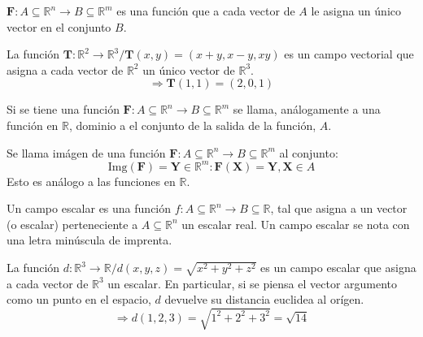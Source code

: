 \begin{definition}
    $\boldsymbol{F}:A\subseteq \mathbb{R}^n \rightarrow B \subseteq \mathbb{R}^m$
    es una función que a cada vector de $A$ le asigna un único vector en el conjunto $B$.
    \begin{example}
        La función $\boldsymbol{T}:\mathbb{R}^2 \rightarrow \mathbb{R}^3 / \boldsymbol{T}(x,y) = (x+y,x-y,xy)$
        es un campo vectorial que asigna a cada vector de $\mathbb{R}^2$ un único vector de $\mathbb{R}^3$.
        \begin{equation*}
            \Rightarrow \boldsymbol{T}(1,1)=(2,0,1)
        \end{equation*}
        \label{ej:campoVectorial}
    \end{example}
\end{definition}
\begin{definition}
    Si se tiene una función $\boldsymbol{F}:A\subseteq \mathbb{R}^n \rightarrow B \subseteq \mathbb{R}^m$
    se llama, análogamente a una función en $\mathbb{R}$, dominio a el conjunto de la salida de la función, $A$.
\end{definition}
\begin{definition}
    Se llama imágen de una función \newline$\boldsymbol{F}:A\subseteq \mathbb{R}^n \rightarrow B \subseteq \mathbb{R}^m$ al conjunto:
    \begin{equation*}
        \text{Img}(\boldsymbol{F})={\boldsymbol{Y}\in\mathbb{R}^m: \boldsymbol{F}(\boldsymbol{X})=\boldsymbol{Y}, \boldsymbol{X} \in A}
    \end{equation*}
    Esto es análogo a las funciones en $\mathbb{R}$.
\end{definition}
\begin{definition}
    Un campo escalar es una función $f:A\subseteq \mathbb{R}^n \rightarrow B \subseteq \mathbb{R}$, tal que asigna
    a un vector (o escalar) perteneciente a $A\subseteq \mathbb{R}^n$ un escalar real.
    Un campo escalar se nota con una letra minúscula de imprenta.
    \begin{example}
        La función $d:\mathbb{R}^3 \rightarrow \mathbb{R} / d(x,y,z) = \sqrt{x^2+y^2+z^2}$
        es un campo escalar que asigna a cada vector de $\mathbb{R}^3$ un escalar. 
        En particular, si se piensa el vector argumento como un punto en el espacio, $d$ devuelve su distancia euclidea al orígen.
        \begin{equation*}
            \Rightarrow d(1,2,3)=\sqrt{1^2+2^2+3^2}=\sqrt{14}
        \end{equation*}
        \label{ej:campoEscalar}
    \end{example}
\end{definition}
